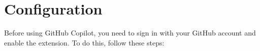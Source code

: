 %
%
%

\newpage
\section{Configuration}
Before using GitHub Copilot, you need to sign in with your GitHub account
and enable the extension.
To do this, follow these steps:

